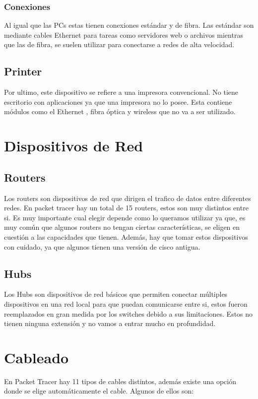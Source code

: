 \documentclass{article}
\begin{document}
\subsubsection{Conexiones}
Al igual que las PCs estas tienen conexiones estándar y de fibra. Las estándar son mediante cables Ethernet para tareas como servidores web o archivos mientras que las de fibra, se suelen utilizar para conectarse a redes de alta velocidad.

\subsection{Printer}
Por ultimo, este dispositivo se refiere a una impresora convencional. No tiene escritorio con aplicaciones ya que una impresora no lo posee. Esta contiene módulos como el Ethernet , fibra óptica y wireless que no va a ser utilizado.

\section{Dispositivos de Red}

\subsection{Routers}
Los routers son dispositivos de red que dirigen el trafico de datos entre diferentes redes. En packet tracer hay un total de 15 routers, estos son muy distintos entre si. Es muy importante cual elegir depende como lo queramos utilizar ya que, es muy común que algunos routers no tengan ciertas características, se eligen en cuestión a las capacidades que tienen. Además, hay que tomar estos dispositivos con cuidado, ya que algunos tienen una versión de cisco antigua.

\subsection{Hubs}
Los Hubs son dispositivos de red básicos que permiten conectar múltiples dispositivos en una red local para que puedan comunicarse entre si, estos fueron reemplazados en gran medida por los switches debido a sus limitaciones. Estos no tienen ninguna extensión y no vamos a entrar mucho en profundidad.

\section{Cableado}
En Packet Tracer hay 11 tipos de cables distintos, además existe una opción donde se elige automáticamente el cable. Algunos de ellos son:
\end{document}
